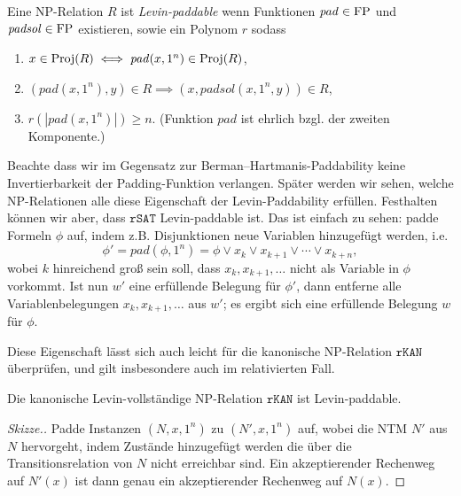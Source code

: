 \begin{definition}\label{def:levin-paddable}
    Eine NP-Relation $R$ ist \emph{Levin-paddable} wenn 
    Funktionen $\mathit{pad}\in\mathrm{FP}$ und $\mathit{padsol}\in\mathrm{FP}$ existieren, sowie ein Polynom $r$ sodass
    \begin{enumerate}
        \item $x\in \operatorname{Proj}(R) \iff \mathit{pad}(x, 1^n) \in \operatorname{Proj}(R)$,
        \item $(\mathit{pad}(x, 1^n), y)\in R \implies (x, \mathit{padsol}(x, 1^n, y)) \in R$,
        \item $r(|\mathit{pad}(x, 1^n)|)\geq n$. (Funktion $\mathit{pad}$ ist ehrlich bzgl. der zweiten Komponente.)\qedhere
    \end{enumerate}
\end{definition}
Beachte dass wir im Gegensatz zur Berman--Hartmanis-Paddability keine Invertierbarkeit der Padding-Funktion verlangen.
Später werden wir sehen, welche NP-Relationen alle diese Eigenschaft der Levin-Paddability erfüllen. Festhalten können wir aber, dass $\mathtt{rSAT}$ Levin-paddable ist. Das ist einfach zu sehen: padde Formeln $\phi$ auf, indem z.B. Disjunktionen neue Variablen hinzugefügt werden, i.e. 
\[ \phi' = \mathit{pad}(\phi, 1^n) = \phi \lor x_k \lor x_{k+1} \lor \cdots \lor x_{k+n}, \]
wobei $k$ hinreichend groß sein soll, dass $x_k, x_{k+1}, \dots$ nicht als Variable in $\phi$ vorkommt.
Ist nun $w'$ eine erfüllende Belegung für $\phi'$, dann entferne alle Variablenbelegungen $x_{k}, x_{k+1}, \dots$ aus $w'$; es ergibt sich eine erfüllende Belegung $w$ für $\phi$.

Diese Eigenschaft lässt sich auch leicht für die kanonische NP-Relation $\mathtt{rKAN}$ überprüfen, und gilt insbesondere auch im relativierten Fall.
\begin{observation}\label{obs:rkan-paddable}
    Die kanonische Levin-vollständige NP-Relation $\mathtt{rKAN}$ ist Levin-paddable.
\end{observation}
\begin{proof}[Skizze.]
    Padde Instanzen $(N, x, 1^n)$ zu $(N', x, 1^n)$ auf, wobei die NTM $N'$ aus $N$ hervorgeht, indem Zustände hinzugefügt werden die über die Transitionsrelation von $N$ nicht erreichbar sind. Ein akzeptierender Rechenweg auf $N'(x)$ ist dann genau ein akzeptierender Rechenweg auf $N(x)$.
\end{proof}


